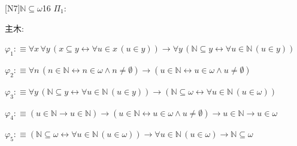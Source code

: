 \begin{fullproof}{[N7]}{$\mathbb{N} \subseteq \omega$}{16}\label{tree:NatSub}
\noindent$\Pi_{1}$:
\begin{ptree}
\end{ptree}
\noindent 主木:
\begin{ptree}
\noLine
{}
\end{ptree}
\begin{abbrevlist}
\item $\varphi_{1} :\equiv \forall x\,\forall y\,(x \subseteq y \leftrightarrow \forall u \in x\,(u \in y)) \to \forall y\,(\mathbb{N} \subseteq y \leftrightarrow \forall u \in \mathbb{N}\,(u \in y))$
\item $\varphi_{2} :\equiv \forall n\,(n \in \mathbb{N} \leftrightarrow n \in \omega \land n \neq \emptyset) \to (u \in \mathbb{N} \leftrightarrow u \in \omega \land u \neq \emptyset)$
\item $\varphi_{3} :\equiv \forall y\,(\mathbb{N} \subseteq y \leftrightarrow \forall u \in \mathbb{N}\,(u \in y)) \to (\mathbb{N} \subseteq \omega \leftrightarrow \forall u \in \mathbb{N}\,(u \in \omega))$
\item $\varphi_{4} :\equiv (u \in \mathbb{N} \to u \in \mathbb{N}) \to (u \in \mathbb{N} \leftrightarrow u \in \omega \land u \neq \emptyset) \to u \in \mathbb{N} \to u \in \omega$
\item $\varphi_{5} :\equiv (\mathbb{N} \subseteq \omega \leftrightarrow \forall u \in \mathbb{N}\,(u \in \omega)) \to \forall u \in \mathbb{N}\,(u \in \omega) \to \mathbb{N} \subseteq \omega$
\end{abbrevlist}
\end{fullproof}
